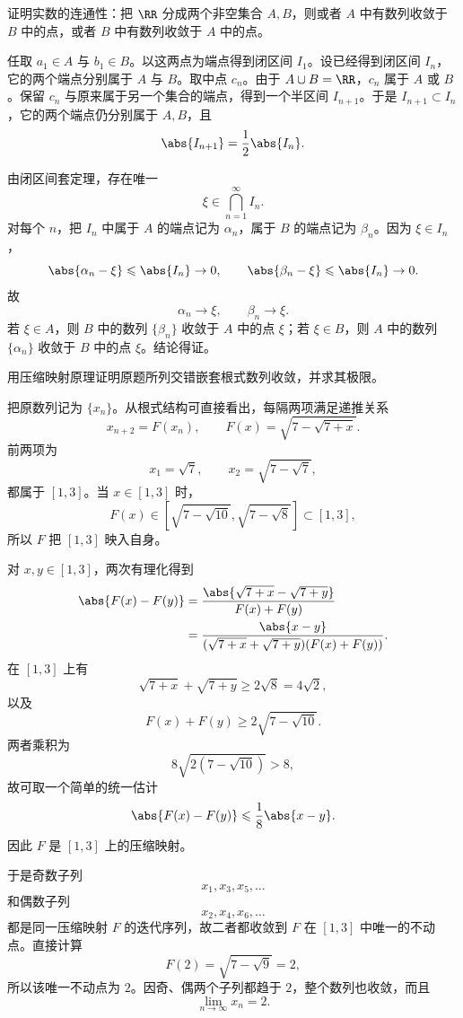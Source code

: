 \begin{xreferenceproblem}[第二组参考题 3]
证明实数的连通性：把 $\RR$ 分成两个非空集合 $A,B$，则或者 $A$ 中有数列收敛于 $B$ 中的点，或者 $B$ 中有数列收敛于 $A$ 中的点。
\end{xreferenceproblem}
\begin{xsolution}
任取 $a_1\in A$ 与 $b_1\in B$。以这两点为端点得到闭区间 $I_1$。设已经得到闭区间 $I_n$，它的两个端点分别属于 $A$ 与 $B$。取中点 $c_n$。由于 $A\cup B=\RR$，$c_n$ 属于 $A$ 或 $B$。保留 $c_n$ 与原来属于另一个集合的端点，得到一个半区间 $I_{n+1}$。于是 $I_{n+1}\subset I_n$，它的两个端点仍分别属于 $A,B$，且
\[
  \abs{I_{n+1}}=\frac12\abs{I_n}.
\]

由闭区间套定理，存在唯一
\[
  \xi\in\bigcap_{n=1}^{\infty}I_n.
\]
对每个 $n$，把 $I_n$ 中属于 $A$ 的端点记为 $\alpha_n$，属于 $B$ 的端点记为 $\beta_n$。因为 $\xi\in I_n$，
\[
  \abs{\alpha_n-\xi}\leqslant\abs{I_n}\to0,
  \qquad
  \abs{\beta_n-\xi}\leqslant\abs{I_n}\to0.
\]
故
\[
  \alpha_n\to\xi,
  \qquad
  \beta_n\to\xi.
\]
若 $\xi\in A$，则 $B$ 中的数列 $\{\beta_n\}$ 收敛于 $A$ 中的点 $\xi$；若 $\xi\in B$，则 $A$ 中的数列 $\{\alpha_n\}$ 收敛于 $B$ 中的点 $\xi$。结论得证。
\end{xsolution}

\begin{xreferenceproblem}[第二组参考题 4]
用压缩映射原理证明原题所列交错嵌套根式数列收敛，并求其极限。
\end{xreferenceproblem}
\begin{xsolution}
把原数列记为 $\{x_n\}$。从根式结构可直接看出，每隔两项满足递推关系
\[
  x_{n+2}=F(x_n),
  \qquad
  F(x)=\sqrt{7-\sqrt{7+x}}.
\]
前两项为
\[
  x_1=\sqrt7,
  \qquad
  x_2=\sqrt{7-\sqrt7},
\]
都属于 $[1,3]$。当 $x\in[1,3]$ 时，
\[
  F(x)\in
  \left[\sqrt{7-\sqrt{10}},\sqrt{7-\sqrt8}\right]
  \subset[1,3],
\]
所以 $F$ 把 $[1,3]$ 映入自身。

对 $x,y\in[1,3]$，两次有理化得到
\begin{align*}
  \abs{F(x)-F(y)}
  &=\frac{\abs{\sqrt{7+x}-\sqrt{7+y}}}{F(x)+F(y)}\\
  &=\frac{\abs{x-y}}
  {(\sqrt{7+x}+\sqrt{7+y})(F(x)+F(y))}.
\end{align*}
在 $[1,3]$ 上有
\[
  \sqrt{7+x}+\sqrt{7+y}\geqslant2\sqrt8=4\sqrt2,
\]
以及
\[
  F(x)+F(y)\geqslant2\sqrt{7-\sqrt{10}}.
\]
两者乘积为
\[
  8\sqrt{2(7-\sqrt{10})}>8,
\]
故可取一个简单的统一估计
\[
  \abs{F(x)-F(y)}\leqslant\frac18\abs{x-y}.
\]
因此 $F$ 是 $[1,3]$ 上的压缩映射。

于是奇数子列
\[
  x_1,x_3,x_5,\ldots
\]
和偶数子列
\[
  x_2,x_4,x_6,\ldots
\]
都是同一压缩映射 $F$ 的迭代序列，故二者都收敛到 $F$ 在 $[1,3]$ 中唯一的不动点。直接计算
\[
  F(2)=\sqrt{7-\sqrt9}=2,
\]
所以该唯一不动点为 $2$。因奇、偶两个子列都趋于 $2$，整个数列也收敛，而且
\[
  \boxed{\lim_{n\to\infty}x_n=2}.
\]
\end{xsolution}

